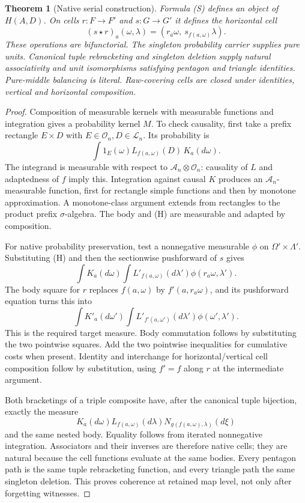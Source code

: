 \documentclass[11pt]{article}
\newtheorem{theorem}{Theorem}[section]
\begin{document}
\begin{theorem}[Native serial construction]\label{kernel:serial}
Formula (S) defines an object of $H(A,D)$. On cells $r:F\to F'$ and $s:G\to G'$ it defines the horizontal cell
\[
 (s\star r)_a(\omega,\lambda)=
       (r_a\omega,\ s_{f(a,\omega)}\lambda).
\tag{H}
\]
These operations are bifunctorial. The singleton probability carrier supplies pure units. Canonical tuple rebracketing and singleton deletion supply natural associativity and unit isomorphisms satisfying pentagon and triangle identities. Pure-middle balancing is literal. Raw-covering cells are closed under identities, vertical and horizontal composition.
\end{theorem}
\begin{proof}
Composition of measurable kernels with measurable functions and integration gives a probability kernel $M$. To check causality, first take a prefix rectangle $E\times D$ with $E\in\mathcal O_n,D\in\mathcal L_n$. Its probability is
\[
 \int 1_E(\omega)L_{f(a,\omega)}(D)\,K_a(d\omega).
\]
The integrand is measurable with respect to $\mathcal A_n\otimes\mathcal O_n$: causality of $L$ and adaptedness of $f$ imply this. Integration against causal $K$ produces an $\mathcal A_n$-measurable function, first for rectangle simple functions and then by monotone approximation. A monotone-class argument extends from rectangles to the product prefix $\sigma$-algebra. The body and (H) are measurable and adapted by composition.

For native probability preservation, test a nonnegative measurable $\phi$ on $\Omega'\times\Lambda'$. Substituting (H) and then the sectionwise pushforward of $s$ gives
\[
 \int K_a(d\omega)\int L'_{f(a,\omega)}(d\lambda')
       \phi(r_a\omega,\lambda').
\]
The body square for $r$ replaces $f(a,\omega)$ by $f'(a,r_a\omega)$, and its pushforward equation turns this into
\[
 \int K'_a(d\omega')\int L'_{f'(a,\omega')}(d\lambda')
       \phi(\omega',\lambda').
\]
This is the required target measure. Body commutation follows by substituting the two pointwise squares. Add the two pointwise inequalities for cumulative costs when present. Identity and interchange for horizontal/vertical cell composition follow by substitution, using $f'=f$ along $r$ at the intermediate argument.

Both bracketings of a triple composite have, after the canonical tuple bijection, exactly the measure
\[
 K_a(d\omega)L_{f(a,\omega)}(d\lambda)
 N_{g(f(a,\omega),\lambda)}(d\xi)
\]
and the same nested body. Equality follows from iterated nonnegative integration. Associators and their inverses are therefore native cells; they are natural because the cell functions evaluate at the same bodies. Every pentagon path is the same tuple rebracketing function, and every triangle path the same singleton deletion. This proves coherence at retained map level, not only after forgetting witnesses.


\end{proof}
\end{document}

